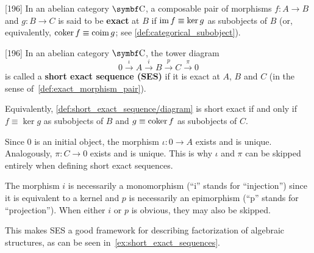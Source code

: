 \begin{definition}\label{def:exact_morphism_pair}\cite{MacLane1994}[196]
  In an abelian category \( \Bold C \), a composable pair of morphisms \( f: A \to B \) and \( g: B \to C \) is said to be \textbf{exact} at \( B \) if \( \operatorname{im} f \equiv \ker g \) as subobjects of \( B \) (or, equivalently, \( \operatorname{coker} f \equiv \operatorname{coim} g \); see \cref{def:categorical_subobject}).
\end{definition}

\begin{definition}\label{def:short_exact_sequence}\cite{MacLane1994}[196]
  In an abelian category \( \Bold C \), the tower diagram
  \begin{equation}\label{def:short_exact_sequence/diagram}
    0
    \overset \iota \longrightarrow
    A
    \overset i \longrightarrow
    B
    \overset p \longrightarrow
    C
    \overset \pi \longrightarrow
    0
  \end{equation}
  is called a \textbf{short exact sequence (SES)} if it is exact at \( A \), \( B \) and \( C \) (in the sense of~\cref{def:exact_morphism_pair}).

  Equivalently, \cref{def:short_exact_sequence/diagram} is short exact if and only if \( f \equiv \ker g \) as subobjects of \( B \) and \( g \equiv \operatorname{coker} f \) as subobjects of \( C \).
\end{definition}

\begin{note}\label{note:short_exact_sequence_factorization}
  Since \( 0 \) is an initial object, the morphism \( \iota: 0 \to A \) exists and is unique. Analogously, \( \pi: C \to 0 \) exists and is unique. This is why \( \iota \) and \( \pi \) can be skipped entirely when defining short exact sequences.

  The morphism \( i \) is necessarily a monomorphism (\enquote{i} stands for \enquote{injection}) since it is equivalent to a kernel and \( p \) is necessarily an epimorphism (\enquote{p} stands for \enquote{projection}). When either \( i \) or \( p \) is obvious, they may also be skipped.

  This makes SES a good framework for describing factorization of algebraic structures, as can be seen in~\cref{ex:short_exact_sequences}.
\end{note}

